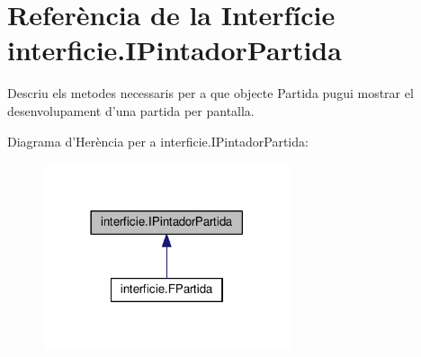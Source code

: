 \hypertarget{interfaceinterficie_1_1_i_pintador_partida}{\section{Referència de la Interfície interficie.\+I\+Pintador\+Partida}
\label{interfaceinterficie_1_1_i_pintador_partida}
}


Descriu els metodes necessaris per a que objecte Partida pugui mostrar el desenvolupament d'una partida per pantalla.  




Diagrama d'Herència per a interficie.\+I\+Pintador\+Partida\+:\nopagebreak
\begin{figure}[H]
\begin{center}
\leavevmode
\includegraphics[width=206pt]{interfaceinterficie_1_1_i_pintador_partida__inherit__graph}
\end{center}
\end{figure}
